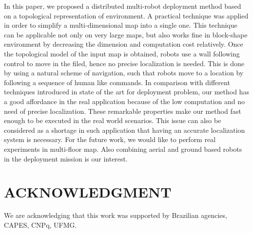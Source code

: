 \documentclass[twocolumn]{svjour3}       %
\begin{document}
In this paper, we proposed a distributed multi-robot deployment method based on a topological representation of environment. A practical technique was applied in order to simplify a multi-dimensional map into a single one. This technique can be applicable not only on very large maps, but also works fine in block-shape environment by decreasing the dimension and computation cost relatively.
%
Once the topological model of the input map is obtained, robots use a wall following control to move in the filed, hence no precise localization is needed. This is done by using a natural scheme of navigation, such that robots move to a location by following a sequence of human like commands. 
%
In comparison with different techniques introduced in state of the art for deployment problem, our method has a good affordance in the real application because of the low computation and no need of precise localization. These remarkable properties make our method fast enough to be executed in the real world scenarios. This issue can also be considered as a shortage in such application that having an accurate localization system is necessary.
%
For the future work, we would like to perform real experiments in multi-floor map. Also combining aerial and ground based robots in the deployment mission is our interest. 

\section*{ACKNOWLEDGMENT}

We are acknowledging that this work was supported by Brazilian agencies, CAPES, CNPq, UFMG.


 
\end{document}
